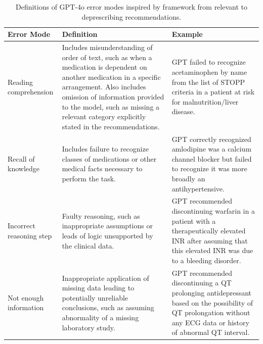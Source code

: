 \begin{table}
\centering
\caption{Definitions of GPT-4o error modes inspired by framework from \citet{lievinCanLargeLanguage2024} relevant to deprescribing recommendations.}
\begin{tabular}{p{}p{}p{}}\toprule
Error Mode & Definition & Example \\ \midrule
Reading comprehension & Includes misunderstanding of order of text, such as when a medication is dependent on another medication in a specific arrangement. Also includes omission of information provided to the model, such as missing a relevant category explicitly stated in the recommendations. & GPT failed to recognize acetaminophen by name from the list of STOPP criteria in a patient at risk for malnutrition/liver disease. \\
Recall of knowledge & Includes failure to recognize classes of medications or other medical facts necessary to perform the task. & GPT correctly recognized amlodipine was a calcium channel blocker but failed to recognize it was more broadly an antihypertensive. \\
Incorrect reasoning step & Faulty reasoning, such as inappropriate assumptions or leads of logic unsupported by the clinical data. & GPT recommended discontinuing warfarin in a patient with a therapeutically elevated INR after assuming that this elevated INR was due to a bleeding disorder. \\
Not enough information & Inappropriate application of missing data leading to potentially unreliable conclusions, such as assuming abnormality of a missing laboratory study. & GPT recommended discontinuing a QT prolonging antidepressant based on the possibility of QT prolongation without any ECG data or history of abnormal QT interval. \\\bottomrule
\end{tabular}%
\label{tab:aim1-error-modes}
\end{table}

